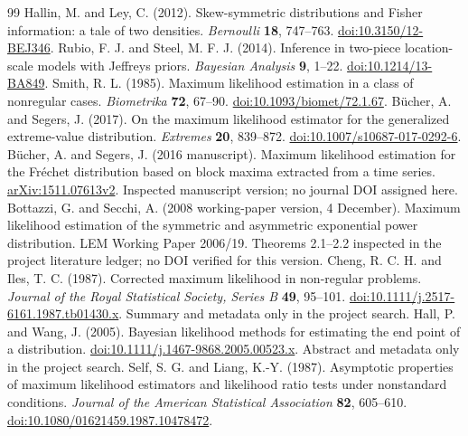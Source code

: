 \documentclass[12pt]{article}
\theoremstyle{definition}
\theoremstyle{remark}
\begin{document}
\begin{thebibliography}{99}
 Hallin, M. and Ley, C. (2012). Skew-symmetric distributions and Fisher information: a tale of two densities. \textit{Bernoulli} \textbf{18}, 747--763. \href{https://doi.org/10.3150/12-BEJ346}{doi:10.3150/12-BEJ346}.
 Rubio, F. J. and Steel, M. F. J. (2014). Inference in two-piece location-scale models with Jeffreys priors. \textit{Bayesian Analysis} \textbf{9}, 1--22. \href{https://doi.org/10.1214/13-BA849}{doi:10.1214/13-BA849}.
 Smith, R. L. (1985). Maximum likelihood estimation in a class of nonregular cases. \textit{Biometrika} \textbf{72}, 67--90. \href{https://doi.org/10.1093/biomet/72.1.67}{doi:10.1093/biomet/72.1.67}.
 B\"ucher, A. and Segers, J. (2017). On the maximum likelihood estimator for the generalized extreme-value distribution. \textit{Extremes} \textbf{20}, 839--872. \href{https://doi.org/10.1007/s10687-017-0292-6}{doi:10.1007/s10687-017-0292-6}.
 B\"ucher, A. and Segers, J. (2016 manuscript). Maximum likelihood estimation for the Fr\'echet distribution based on block maxima extracted from a time series. \href{https://arxiv.org/abs/1511.07613}{arXiv:1511.07613v2}. Inspected manuscript version; no journal DOI assigned here.
 Bottazzi, G. and Secchi, A. (2008 working-paper version, 4 December). Maximum likelihood estimation of the symmetric and asymmetric exponential power distribution. LEM Working Paper 2006/19. Theorems 2.1--2.2 inspected in the project literature ledger; no DOI verified for this version.
 Cheng, R. C. H. and Iles, T. C. (1987). Corrected maximum likelihood in non-regular problems. \textit{Journal of the Royal Statistical Society, Series B} \textbf{49}, 95--101. \href{https://doi.org/10.1111/j.2517-6161.1987.tb01430.x}{doi:10.1111/j.2517-6161.1987.tb01430.x}. Summary and metadata only in the project search.
 Hall, P. and Wang, J. (2005). Bayesian likelihood methods for estimating the end point of a distribution. \href{https://doi.org/10.1111/j.1467-9868.2005.00523.x}{doi:10.1111/j.1467-9868.2005.00523.x}. Abstract and metadata only in the project search.
 Self, S. G. and Liang, K.-Y. (1987). Asymptotic properties of maximum likelihood estimators and likelihood ratio tests under nonstandard conditions. \textit{Journal of the American Statistical Association} \textbf{82}, 605--610. \href{https://doi.org/10.1080/01621459.1987.10478472}{doi:10.1080/01621459.1987.10478472}.
\end{thebibliography}
\end{document}
